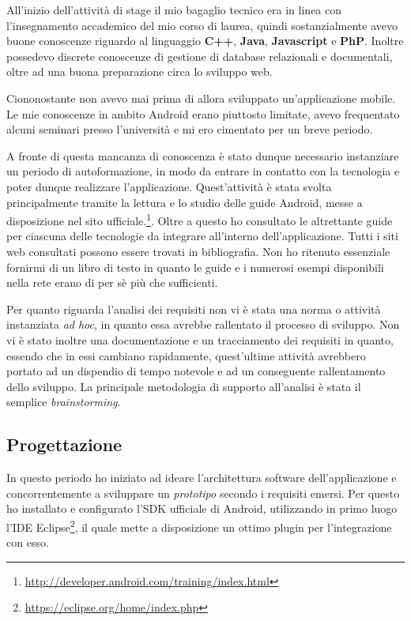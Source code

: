 All'inizio dell'attività di stage il mio bagaglio tecnico era in linea con l'insegnamento accademico del mio corso di laurea, quindi sostanzialmente avevo buone conoscenze riguardo al linguaggio \textbf{C++}, \textbf{Java}, \textbf{Javascript} e \textbf{PhP}. Inoltre possedevo discrete conoscenze di gestione di database relazionali e documentali, oltre ad una buona preparazione circa lo sviluppo web.

Ciononostante non avevo mai prima di allora sviluppato un'applicazione mobile. Le mie conoscenze in ambito Android erano piuttosto limitate, avevo frequentato alcuni seminari presso l'università e mi ero cimentato per un breve periodo.

A fronte di questa mancanza di conoscenza è stato dunque necessario instanziare un periodo di autoformazione, in modo da entrare in contatto con la tecnologia e poter dunque realizzare l'applicazione. Quest'attività è stata svolta principalmente tramite la lettura e lo studio delle guide Android, messe a disposizione nel sito ufficiale.\footnote{\url{http://developer.android.com/training/index.html}}. Oltre a questo ho consultato le altrettante guide per ciascuna delle tecnologie da integrare all'interno dell'applicazione. Tutti i siti web consultati possono essere trovati in bibliografia. Non ho ritenuto essenziale fornirmi di un libro di testo in quanto le guide e i numerosi esempi disponibili nella rete erano di per sè più che sufficienti.

Per quanto riguarda l'analisi dei requisiti non vi è stata una norma o attività instanziata \textit{ad hoc}, in quanto essa avrebbe rallentato il processo di sviluppo. Non vi è stato inoltre una documentazione e un tracciamento dei requisiti in quanto, essendo che in essi cambiano rapidamente, quest'ultime attività avrebbero portato ad un dispendio di tempo notevole e ad un conseguente rallentamento dello sviluppo. La principale metodologia di supporto all'analisi è stata il semplice \textit{brainstorming}.

\subsection*{Progettazione}

In questo periodo ho iniziato ad ideare l'architettura software dell'applicazione e concorrentemente a sviluppare un \textit{prototipo} secondo i requisiti emersi. Per questo ho installato e configurato l'SDK ufficiale di Android, utilizzando in primo luogo l'IDE Eclipse\footnote{\url{https://eclipse.org/home/index.php}}, il quale mette a disposizione un ottimo plugin per l'integrazione con esso. 

